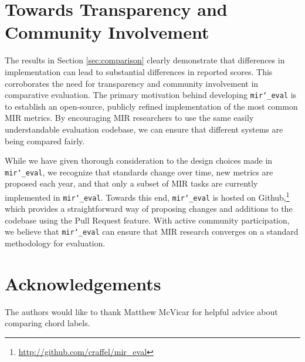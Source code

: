\documentclass{article}
\def\mireval{\texttt{mir\char`_eval}}
\begin{document}
\section{Towards Transparency and Community Involvement}
\label{sec:discussion}

The results in Section \ref{sec:comparison} clearly demonstrate that differences in implementation can lead to substantial differences in reported scores.
This corroborates the need for transparency and community involvement in comparative evaluation.
The primary motivation behind developing \mireval{} is to establish an open-source, publicly refined implementation of the most common MIR metrics.
By encouraging MIR researchers to use the same easily understandable evaluation codebase, we can ensure that different systems are being compared fairly.

While we have given thorough consideration to the design choices made in \mireval{}, we recognize that standards change over time, new metrics are proposed each year, and that only a subset of MIR tasks are currently implemented in \mireval{}.
Towards this end, \mireval{} is hosted on Github,\footnote{\url{http://github.com/craffel/mir_eval}} which provides a straightforward way of proposing changes and additions to the codebase using the Pull Request feature.
With active community participation, we believe that \mireval{} can ensure that MIR research converges on a standard methodology for evaluation.

\section{Acknowledgements}

The authors would like to thank Matthew McVicar for helpful advice about comparing chord labels.


\end{document}
